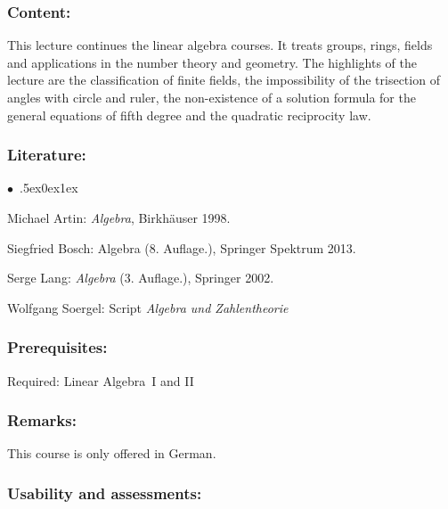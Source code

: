 \documentclass[a4paper,10pt]{article}
\renewenvironment{itemize}{\begin{list}{$\bullet$\ }{\itemsep.5ex\setlength{\topsep}{0.5\itemsep}\parsep0ex\labelsep1ex\settowidth{\labelwidth}{$\bullet$\ }\setlength{\leftmargin}{\labelwidth}\addtolength{\leftmargin}{3ex}\addtolength{\leftmargin}{\labelsep}}}{\end{list}}
\begin{document}
\subsubsection*{\large
    Content:
}
This lecture continues the linear algebra courses. It treats groups, rings, fields and applications in the number theory and geometry. The highlights of the lecture are the classification of finite fields, the impossibility of the trisection of angles with circle and ruler, the non-existence of a solution formula for the general equations of fifth degree and the quadratic reciprocity law.
\subsubsection*{\large
    Literature:
}
\begin{itemize}
\item Michael Artin: \emph{Algebra}, Birkhäuser 1998.
\item Siegfried Bosch: Algebra (8. Auf\/lage.), Springer Spektrum 2013.
\item Serge Lang: \emph{Algebra} (3. Auf\/lage.), Springer 2002.
\item Wolfgang Soergel: Script \emph{Algebra und Zahlentheorie}
\end{itemize}
\subsubsection*{\large
    Prerequisites:
}
Required: Linear Algebra~I and II
\subsubsection*{\large
    Remarks:
}
This course is only offered in German.
\subsubsection*{\large
    Usability and assessments:
}
\end{document}
